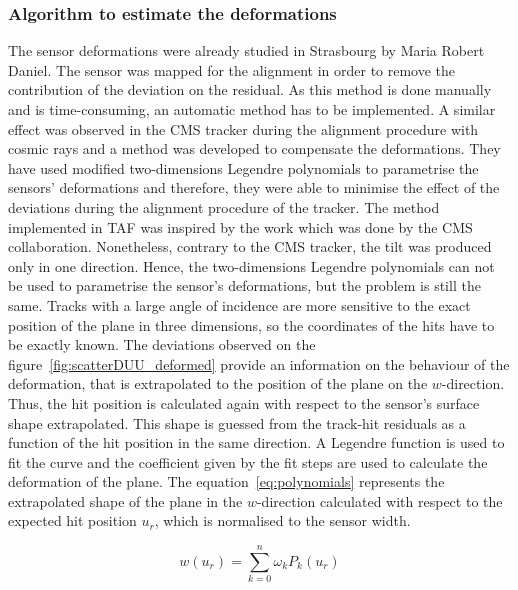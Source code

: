       \subsubsection{Algorithm to estimate the deformations}

      The sensor deformations were already studied in Strasbourg by Maria Robert Daniel.
      The sensor was mapped for the alignment in order to remove the contribution of the deviation on the residual\cite{maria}.
      As this method is done manually and is time-consuming, an automatic method has to be implemented.
      A similar effect was observed in the CMS tracker during the alignment procedure with cosmic rays and a method was developed to compensate the deformations\cite{CMSalignment}. 
      They have used modified two-dimensions Legendre polynomials to parametrise the sensors' deformations and therefore, they were able to minimise the effect of the deviations during the alignment procedure of the tracker.
      The method implemented in TAF was inspired by the work which was done by the CMS collaboration.
      Nonetheless, contrary to the CMS tracker, the tilt was produced only in one direction.
      Hence, the two-dimensions Legendre polynomials can not be used to parametrise the sensor's deformations, but the problem is still the same.
      Tracks with a large angle of incidence are more sensitive to the exact position of the plane in three dimensions, so the coordinates of the hits have to be exactly known.
      The deviations observed on the figure~\ref{fig:scatterDUU_deformed} provide an information on the behaviour of the deformation, that is extrapolated to the position of the plane on the $w$-direction.
      Thus, the hit position is calculated again with respect to the sensor's surface shape extrapolated.
      This shape is guessed from the track-hit residuals as a function of the hit position in the same direction.
      A Legendre function is used to fit the curve and the coefficient given by the fit steps are used to calculate the deformation of the plane.
      The equation~\ref{eq:polynomials} represents the extrapolated shape of the plane in the $w$-direction calculated with respect to the expected hit position $u_{r}$, which is normalised to the sensor width.

      \begin{equation}
        w\left(u_{r}\right) = \sum_{k=0}^n \omega_{k}P_{k}\left(u_{r}\right)
        \label{eq:polynomials}
      \end{equation}
      
